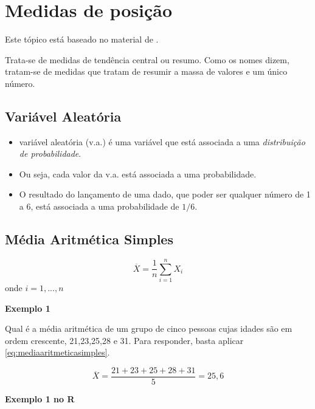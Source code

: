 \documentclass[
]{book}
\providecommand{\tightlist}{%
  \setlength{\itemsep}{0pt}\setlength{\parskip}{0pt}}
\begin{document}
\hypertarget{medidas-de-posiuxe7uxe3o}{%
\section{Medidas de posição}\label{medidas-de-posiuxe7uxe3o}}

Este tópico está baseado no material de \citet{Sartoris2013}.

Trata-se de medidas de tendência central ou resumo. Como os nomes dizem, tratam-se de medidas que tratam de resumir a massa de valores e um único número.

\hypertarget{variuxe1vel-aleatuxf3ria}{%
\subsection{Variável Aleatória}\label{variuxe1vel-aleatuxf3ria}}

\begin{itemize}
\tightlist
\item
  variável aleatória (v.a.) é uma variável que está associada a uma \emph{distribuição de probabilidade}.
\item
  Ou seja, cada valor da v.a. está associada a uma probabilidade.
\item
  O resultado do lançamento de uma dado, que poder ser qualquer número de 1 a 6, está associada a uma probabilidade de \(1/6\).
\end{itemize}

\hypertarget{muxe9dia-aritmuxe9tica-simples}{%
\subsection{Média Aritmética Simples}\label{muxe9dia-aritmuxe9tica-simples}}

\begin{equation}
    \overline{X} = \frac{1}{n} \sum_{i=1}^{n} X_i
    \label{eq:mediaaritmeticasimples}
\end{equation}
onde \(i =1, ...,n\)

\textbf{Exemplo 1}

Qual é a média aritmética de um grupo de cinco pessoas cujas idades são em ordem crescente, 21,23,25,28 e 31. Para responder, basta aplicar \eqref{eq:mediaaritmeticasimples}.

\begin{equation*}
  \overline{X} = \frac{21+23+25+28+31}{5} = 25,6
\end{equation*}

\textbf{Exemplo 1 no R}
\end{document}
